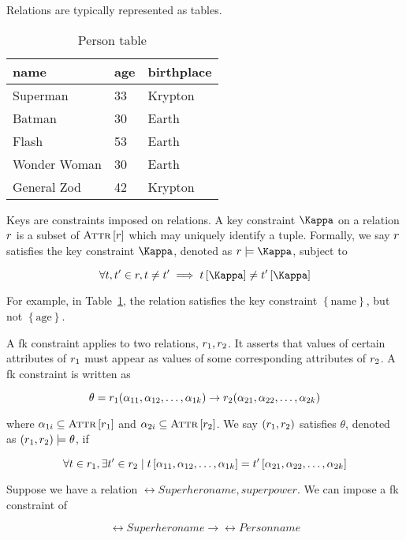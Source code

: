 	Relations are typically represented as tables.
	
	\begin{table}[!ht]
		\centering
		\begin{tabular}{lll}
			\toprule
			name & age & birthplace \\
			\midrule
			Superman & 33 & Krypton \\
			Batman & 30 & Earth \\
			Flash & 53 & Earth \\
			Wonder Woman & 30 & Earth \\
			General Zod & 42 & Krypton \\
			\bottomrule
		\end{tabular}
		
		\caption{Person table}
		\label{tbl:person}
	\end{table}
	
	\begin{defn}[Keys]
	\label{def:keys}
		Keys are constraints imposed on relations.  A key constraint $\key$ on a relation $r$ is a subset of $\textsc{Attr}\left[r\right]$ which may uniquely identify a tuple.  Formally, we say $r$ satisfies the key constraint $\key$, denoted as $\relation \models \key$, subject to
		
		$$\forall \tuple, \tuple' \in \relation, \tuple \not= \tuple' \implies \tuple\left[\key\right] \not= \tuple'\left[\key\right]$$
		
		For example, in Table~\ref{tbl:person}, the relation satisfies the key constraint $\left\{\mathrm{name}\right\}$, but not $\left\{\mathrm{age}\right\}$.
	\end{defn}
	
	\begin{defn}
	\label{def:foreign-keys}
		A \gls{fk} constraint applies to two relations, $r_1, r_2$.  It asserts that values of certain attributes of $r_1$ must appear as values of some corresponding attributes of $r_2$.  A \gls{fk} constraint is written as
		
		$$\theta = r_1(\alpha_{11}, \alpha_{12}, \dotsc, \alpha_{1k}) \rightarrow r_2(\alpha_{21}, \alpha_{22}, \dotsc, \alpha_{2k})$$
		
		where $\alpha_{1i} \subseteq \textsc{Attr}\left[r_1\right]$ and $\alpha_{2i} \subseteq \textsc{Attr}\left[r_2\right]$.  We say $\left(r_1, r_2\right)$ satisfies $\theta$, denoted as $\left(r_1, r_2\right) \models \theta$, if
		
		$$\forall t \in r_1, \exists t' \in r_2 \mid t\left[\alpha_{11}, \alpha_{12}, \dotsc, \alpha_{1k}\right] = t'\left[\alpha_{21}, \alpha_{22}, \dotsc, \alpha_{2k}\right]$$
		
		\begin{ex}
			Suppose we have a relation $\rel{Superhero}{name, superpower}$.  We can impose a \gls{fk} constraint of
			
			$$\rel{Superhero}{name} \rightarrow \rel{Person}{name}$$
		\end{ex}
	\end{defn}
	

